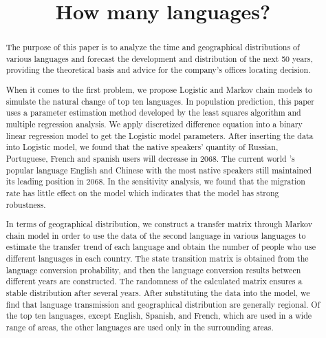 \documentclass[12pt]{article}  %
\title{How many languages?}  %
\begin{document}
\begin{abstract}

 The purpose of this paper is to analyze the time and geographical distributions of various languages and forecast the development and
 distribution of the next 50 years, providing the theoretical basis and advice for the company's offices locating decision.
	
 When it comes to the  first problem, we propose Logistic and Markov chain models to simulate the natural change of top ten languages. In population prediction, this paper uses a parameter estimation method developed by the least squares algorithm and multiple regression analysis. We apply discretized difference equation into a binary linear regression model to get the Logistic model parameters. After inserting the data into Logistic model, we found that the native speakers' quantity of Russian, Portuguese, French and spanish users will decrease in 2068. The current world ’s popular language English and Chinese with the most native speakers still maintained its leading position in 2068. In the sensitivity analysis, we found that the migration rate has little effect on the model which indicates that the model has strong robustness.
 
 In terms of geographical distribution, we construct a transfer matrix through Markov chain model in order to use the data of the second language in various languages to estimate the transfer trend of each language and obtain the number of people who use different languages in each country. The state transition matrix is obtained from the language conversion probability, and then the language conversion results between different years are constructed. The randomness of the calculated matrix ensures a stable distribution after several years. After substituting the data into the model, we find that language transmission and geographical distribution are generally regional. Of the top ten languages, except English, Spanish, and French, which are used in a wide range of areas, the other languages are used only in the surrounding areas.
 

\end{abstract}
\end{document}

